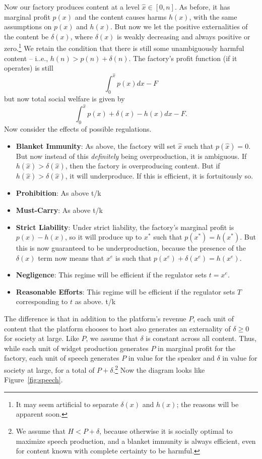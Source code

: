  Now our factory produces content at a level $\hat{x} \in [0,n]$. As before, it has  marginal profit $p(x)$ and the content causes harms $h(x)$, with the same assumptions on $p(x)$ and $h(x)$. But now we let the positive externalities  of the content be $\delta(x)$, where $\delta(x)$ is weakly decreasing and always positive or zero.\footnote{It may seem artificial to separate $\delta(x)$ and $h(x)$; the reasons will be apparent soon.} We retain the condition that there is still some unambiguously harmful content -- i..e., $h(n) > p(n) + \delta(n)$. The factory's profit function (if it operates) is still 
\begin{equation}
\int_{0}^{\hat{x}} p(x) dx - F
\end{equation}
but now total social welfare is given by
\begin{equation}
\int_{0}^{\hat{x}} p(x) + \delta(x) - h(x) dx - F.
\end{equation}
Now consider the effects of possible regulations.
\begin{itemize}
	\item \textbf{Blanket Immunity}: As above, the factory will set $\hat{x}$ such that $p(\hat{x}) = 0$. But now instead of this \emph{definitely} being overproduction, it is ambiguous. If $h(\hat{x}) > \delta(\hat{x})$, then the factory is overproducing content. But if  $h(\hat{x}) > \delta(\hat{x})$, it will underproduce. If this is efficient, it is fortuitously so.
	\item \textbf{Prohibition}: As above t/k
	\item \textbf{Must-Carry}: As above t/k
	\item \textbf{Strict Liability}: Under strict liability, the factory's marginal profit is $p(x) - h(x)$, so it will produce up to $x^*$ such that $p(x^*) = h(x^*)$. But this is now guaranteed to be underproduction, because the presence of the $\delta(x)$ term now means that $x^e$ is such that $p(x^e) + \delta(x^e) = h(x^e)$.
	 \item \textbf{Negligence}: This regime will be efficient if the regulator sets $t = x^e$.
	 \item \textbf{Reasonable Efforts}: This regime will be efficient if the regulator sets $T$ corresponding to $t$ as above. t/k
\end{itemize}



The difference is that in addition to the platform's revenue $P$, each unit of content that the platform chooses to host also generates an externality of  $\delta \ge 0$ for society at large. Like $P$, we assume that $\delta$ is constant across all content. Thus, while each unit of widget production generates $P$ in marginal profit for the factory, each unit of speech generates $P$ in value for the speaker and $\delta$ in value for society at large, for a total of $P + \delta$.\footnote{We assume that $H < P + \delta$, because otherwise it is socially optimal to maximize speech production, and a blanket immunity is always efficient, even for content known with complete certainty to be harmful.} Now the diagram looks like Figure~\ref{fig:speech}.


